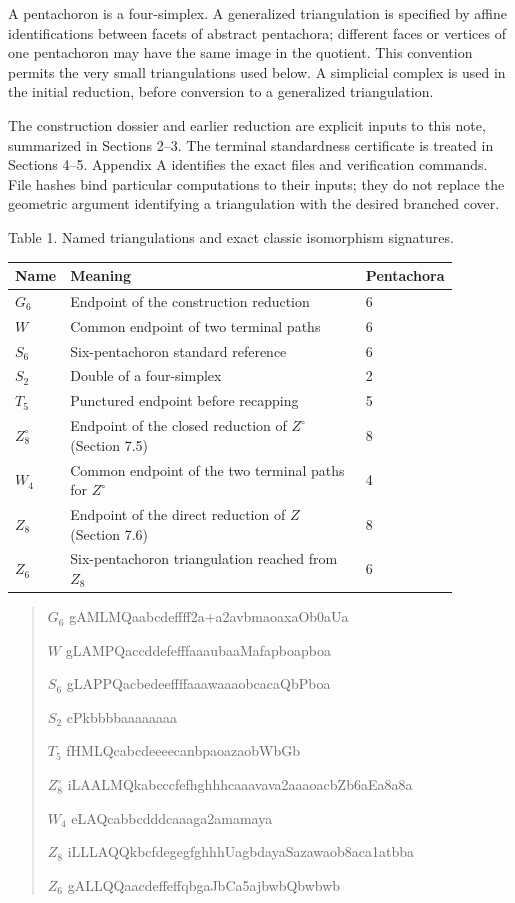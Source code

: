\documentclass[11pt,letterpaper]{article}
\begin{document}
A pentachoron is a four-simplex. A generalized triangulation is specified by affine identifications between facets of abstract pentachora; different faces or vertices of one pentachoron may have the same image in the quotient. This convention permits the very small triangulations used below. A simplicial complex is used in the initial reduction, before conversion to a generalized triangulation.

The construction dossier and earlier reduction are explicit inputs to this note, summarized in Sections 2--3. The terminal standardness certificate is treated in Sections 4--5. Appendix A identifies the exact files and verification commands. File hashes bind particular computations to their inputs; they do not replace the geometric argument identifying a triangulation with the desired branched cover.

\noindent\begin{minipage}{\linewidth}
\begin{center}\small
Table 1. Named triangulations and exact classic isomorphism signatures.\par\smallskip
\begin{tabular}{p{0.08\linewidth}p{0.67\linewidth}p{0.13\linewidth}}
\toprule
\textbf{Name} & \textbf{Meaning} & \textbf{Pentachora} \\
\midrule
$G_6$ & Endpoint of the construction reduction & 6 \\
$W$ & Common endpoint of two terminal paths & 6 \\
$S_6$ & Six-pentachoron standard reference & 6 \\
$S_2$ & Double of a four-simplex & 2 \\
$T_5$ & Punctured endpoint before recapping & 5 \\
$Z^\circ_8$ & Endpoint of the closed reduction of $Z^\circ$ (Section 7.5) & 8 \\
$W_4$ & Common endpoint of the two terminal paths for $Z^\circ$ & 4 \\
$Z_8$ & Endpoint of the direct reduction of $Z$ (Section 7.6) & 8 \\
$Z_6$ & Six-pentachoron triangulation reached from $Z_8$ & 6 \\
\bottomrule
\end{tabular}
\end{center}
\begin{quote}\small\ttfamily
$G_6$  gAMLMQaabcdeffff2a+a2avbmaoaxaOb0aUa\par
$W$  gLAMPQaccddefefffaaaubaaMafapboapboa\par
$S_6$  gLAPPQacbedeeffffaaawaaaobcacaQbPboa\par
$S_2$  cPkbbbbaaaaaaaa\par
$T_5$  fHMLQcabcdeeeecanbpaoazaobWbGb\par
$Z^\circ_8$ iLAALMQkabcccfefhghhhcaaavava2aaaoacbZb6aEa8a8a\par
$W_4$  eLAQcabbcdddcaaaga2amamaya\par
$Z_8$  iLLLAQQkbcfdegegfghhhUagbdayaSazawaob8aca1atbba\par
$Z_6$  gALLQQaacdeffeffqbgaJbCa5ajbwbQbwbwb\par
\end{quote}
\end{minipage}\par\smallskip
\end{document}
